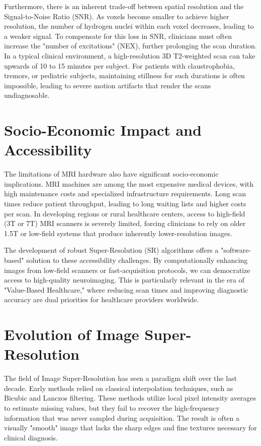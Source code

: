 Furthermore, there is an inherent trade-off between spatial resolution and the Signal-to-Noise Ratio (SNR). As voxels become smaller to achieve higher resolution, the number of hydrogen nuclei within each voxel decreases, leading to a weaker signal. To compensate for this loss in SNR, clinicians must often increase the "number of excitations" (NEX), further prolonging the scan duration. In a typical clinical environment, a high-resolution 3D T2-weighted scan can take upwards of 10 to 15 minutes per subject. For patients with claustrophobia, tremors, or pediatric subjects, maintaining stillness for such durations is often impossible, leading to severe motion artifacts that render the scans undiagnosable.

\section{Socio-Economic Impact and Accessibility}
The limitations of MRI hardware also have significant socio-economic implications. MRI machines are among the most expensive medical devices, with high maintenance costs and specialized infrastructure requirements. Long scan times reduce patient throughput, leading to long waiting lists and higher costs per scan. In developing regions or rural healthcare centers, access to high-field (3T or 7T) MRI scanners is severely limited, forcing clinicians to rely on older 1.5T or low-field systems that produce inherently lower-resolution images.

The development of robust Super-Resolution (SR) algorithms offers a "software-based" solution to these accessibility challenges. By computationally enhancing images from low-field scanners or fast-acquisition protocols, we can democratize access to high-quality neuroimaging. This is particularly relevant in the era of "Value-Based Healthcare," where reducing scan times and improving diagnostic accuracy are dual priorities for healthcare providers worldwide.

\section{Evolution of Image Super-Resolution}
The field of Image Super-Resolution has seen a paradigm shift over the last decade. Early methods relied on classical interpolation techniques, such as Bicubic and Lanczos filtering. These methods utilize local pixel intensity averages to estimate missing values, but they fail to recover the high-frequency information that was never sampled during acquisition. The result is often a visually "smooth" image that lacks the sharp edges and fine textures necessary for clinical diagnosis.

